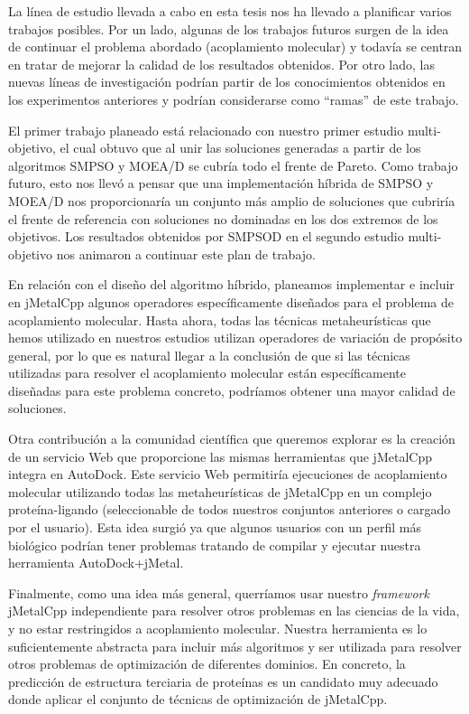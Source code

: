La línea de estudio llevada a cabo en esta tesis nos ha llevado a planificar varios trabajos posibles. Por un lado, algunas de los trabajos futuros surgen de la idea de continuar el problema abordado (acoplamiento molecular) y todavía se centran en tratar de mejorar la calidad de los resultados obtenidos. Por otro lado, las nuevas líneas de investigación podrían partir de los conocimientos obtenidos en los experimentos anteriores y podrían considerarse como ``ramas'' de este trabajo.

El primer trabajo planeado está relacionado con nuestro primer estudio multi-objetivo, el cual obtuvo que al unir las soluciones generadas a partir de los algoritmos SMPSO y MOEA/D se cubría todo el frente de Pareto. Como trabajo futuro, esto nos llevó a pensar que una implementación híbrida de SMPSO y MOEA/D nos proporcionaría un conjunto más amplio de soluciones que cubriría el frente de referencia con soluciones no dominadas en los dos extremos de los objetivos. Los resultados obtenidos por SMPSOD en el segundo estudio multi-objetivo nos animaron a continuar este plan de trabajo.

En relación con el diseño del algoritmo híbrido, planeamos implementar e incluir en jMetalCpp algunos operadores específicamente diseñados para el problema de acoplamiento molecular. Hasta ahora, todas las técnicas metaheurísticas que hemos utilizado en nuestros estudios utilizan operadores de variación de propósito general, por lo que es natural llegar a la conclusión de que si las técnicas utilizadas para resolver el acoplamiento molecular están específicamente diseñadas para este problema concreto, podríamos obtener una mayor calidad de soluciones.

Otra contribución a la comunidad científica que queremos explorar es la creación de un servicio Web que proporcione las mismas herramientas que jMetalCpp integra en AutoDock. Este servicio Web permitiría ejecuciones de acoplamiento molecular utilizando todas las metaheurísticas de jMetalCpp en un complejo proteína-ligando (seleccionable de todos nuestros conjuntos anteriores o cargado por el usuario). Esta idea surgió ya que algunos usuarios con un perfil más biológico podrían tener problemas tratando de compilar y ejecutar nuestra herramienta AutoDock+jMetal.

Finalmente, como una idea más general, querríamos usar nuestro \emph{framework} jMetalCpp independiente para resolver otros problemas en las ciencias de la vida, y no estar restringidos a acoplamiento molecular. Nuestra herramienta es lo suficientemente abstracta para incluir más algoritmos y ser utilizada para resolver otros problemas de optimización de diferentes dominios. En concreto, la predicción de estructura terciaria de proteínas es un candidato muy adecuado donde aplicar el conjunto de técnicas de optimización de jMetalCpp.